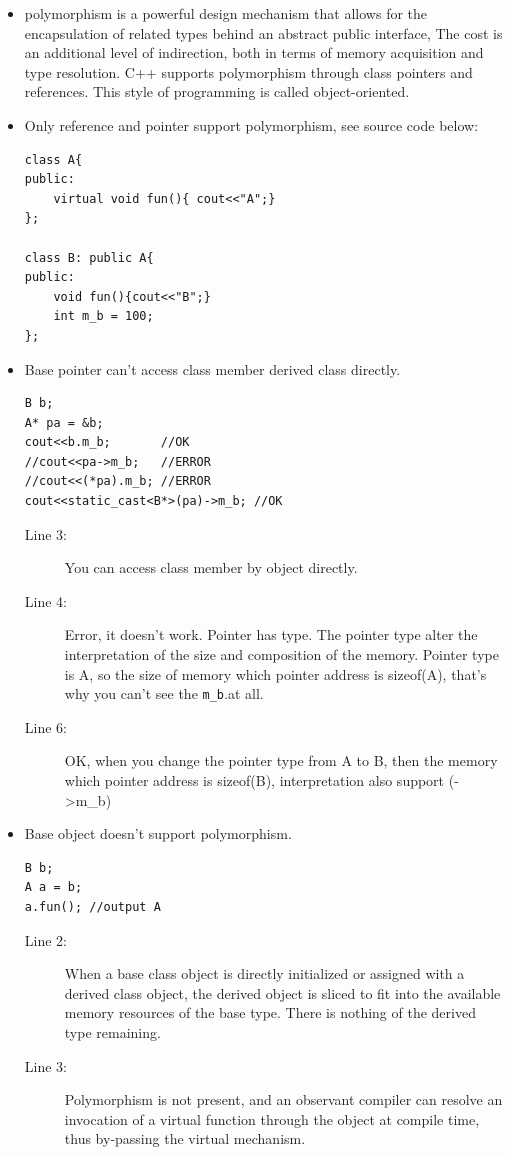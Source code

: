\documentclass[a4paper,11pt,twoside]{book}
\begin{document}
\begin{itemize}
	\item polymorphism is a powerful design mechanism that allows for the encapsulation of related types behind an abstract public interface, The cost is an additional level of indirection, both in terms of memory acquisition and type resolution. C++ supports polymorphism through class pointers and references. This style of programming is called object-oriented.
	
	\item Only reference and pointer support polymorphism, see source code below:

\begin{lstlisting}[numbers=none]
class A{
public:
	virtual void fun(){ cout<<"A";}
};
	
class B: public A{
public:
	void fun(){cout<<"B";}
	int m_b = 100;
};
\end{lstlisting}
	\item Base pointer can't access class member derived class directly.
	
\begin{lstlisting}
B b;
A* pa = &b;
cout<<b.m_b;       //OK
//cout<<pa->m_b;   //ERROR 
//cout<<(*pa).m_b; //ERROR
cout<<static_cast<B*>(pa)->m_b; //OK
\end{lstlisting}
\begin{description}
	\item[Line 3:] You can access class member by object directly.
	\item[Line 4:] Error, it doesn't work. Pointer has type. The pointer type alter the interpretation of the size and composition of the memory. Pointer type is A, so the size of memory which pointer address is sizeof(A), that's why you can't see the \texttt{m\_b}.at all.
	\item[Line 6:] OK, when you change the pointer type from A to B, then the memory which pointer address is sizeof(B), interpretation also support (->m\_b) 
\end{description}

\item Base object doesn't support polymorphism.
\begin{lstlisting}
B b;
A a = b;
a.fun(); //output A
\end{lstlisting}
\begin{description}
	\item[Line 2:] When a base class object is directly initialized or assigned with a derived class object, the derived object is sliced to fit into the available memory resources of the base type. There is nothing of the derived type remaining. 
	\item[Line 3:] Polymorphism is not present, and an observant compiler can resolve an invocation of a virtual function through the object at compile time, thus by-passing the virtual mechanism.
\end{description}


\end{itemize}
\end{document}
